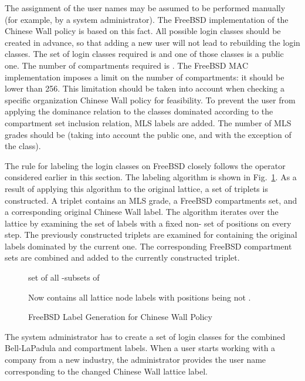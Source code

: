 \documentclass[10pt,a4paper,conference,onecolumn]{IEEEtran}
\begin{document}
The assignment of the user names may be assumed to be performed
manually (for example, by a system administrator). The FreeBSD implementation 
of the Chinese Wall policy is based on this fact. All possible
login classes should be created in advance, so that adding a new user
will not lead to rebuilding the login classes. The set of login classes
required is  and one of those classes is a public one. The number 
of compartments required is . The FreeBSD MAC implementation 
imposes a limit on the number of compartments: it should be lower than 256.
This limitation should be taken into account when checking a specific organization
Chinese Wall policy for feasibility. To prevent the user from applying the 
dominance relation to the classes dominated according to the compartment 
set inclusion relation, MLS labels are added. The number of MLS grades
should be  (taking into account the public one, and with
the exception of the  class).

The rule for labeling the login classes
on FreeBSD closely follows the  operator considered earlier in this section.
The labeling algorithm is shown in Fig.~\ref{KBER:ChWall}. As a result
of applying this algorithm to the original lattice, a set of triplets 
is constructed. A triplet contains an MLS grade, a FreeBSD compartments set, and
a corresponding original Chinese Wall label. The algorithm iterates over the
lattice by examining the set of labels with a fixed non- set of positions 
on every step. The previously constructed triplets are examined for containing
the original labels dominated by the current one. The corresponding FreeBSD
compartment sets are combined and added to the currently constructed triplet. 

\begin{figure}[ht]
\begin{algorithmic}[1]
\State 
\ForAll {}
        \State 
  \State 
\EndFor
\For {}
        \State 
        \State  set of all -subsets of 
        \ForAll {}
                
                \Statex Now  contains all lattice node labels with  positions being not .
        \EndFor
        \ForAll {}
                \State 
                \State 
        \EndFor
\EndFor
\State 
\end{algorithmic}
\caption{FreeBSD Label Generation for Chinese Wall Policy}
\label{KBER:ChWall}
\end{figure}


The system 
administrator has to create a set of login classes for the combined 
Bell-LaPadula and compartment labels.
When a user starts working with a company from a new industry, the administrator
provides the user name corresponding to the changed Chinese Wall lattice label.
\end{document}
